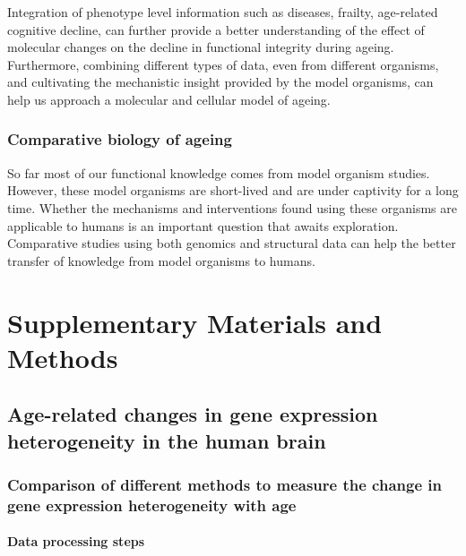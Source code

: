 \documentclass[12pt,twoside]{unicam}
\begin{document}
Integration of phenotype level information such as diseases, frailty, age-related cognitive decline, can further provide a better understanding of the effect of molecular changes on the decline in functional integrity during ageing. Furthermore, combining different types of data, even from different organisms, and cultivating the mechanistic insight provided by the model organisms, can help us approach a molecular and cellular model of ageing.

\hypertarget{comparative-biology-of-ageing}{%
\subsection{Comparative biology of ageing}\label{comparative-biology-of-ageing}}

So far most of our functional knowledge comes from model organism studies. However, these model organisms are short-lived and are under captivity for a long time. Whether the mechanisms and interventions found using these organisms are applicable to humans is an important question that awaits exploration. Comparative studies using both genomics and structural data can help the better transfer of knowledge from model organisms to humans.

\appendix

\hypertarget{supplementary-materials-and-methods}{%
\chapter{Supplementary Materials and Methods}\label{supplementary-materials-and-methods}}

\hypertarget{age-related-changes-in-gene-expression-heterogeneity-in-the-human-brain}{%
\section{Age-related changes in gene expression heterogeneity in the human brain}\label{age-related-changes-in-gene-expression-heterogeneity-in-the-human-brain}}

\hypertarget{veronikaMethods}{%
\subsection{Comparison of different methods to measure the change in gene expression heterogeneity with age}\label{veronikaMethods}}

\hypertarget{data-processing-steps}{%
\subsubsection{Data processing steps}\label{data-processing-steps}}
\end{document}
